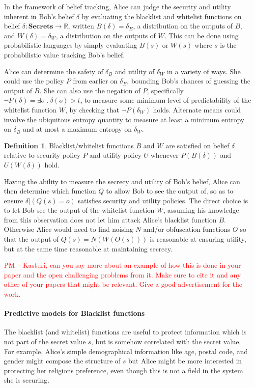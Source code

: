 \documentclass{article} %
\newcommand{\pxm}[1]{\textcolor{red}{PM -- #1}}
\newcommand{\ra}{\rightarrow}
\newcommand{\Real}{\mathbb{R}}
\newcommand{\secrets}[0]{\textbf{Secrets}}
\newcommand{\paren}[1]{\left( #1 \right)}
\newcommand{\cond}[0]{|}
\newcommand{\qsep}[0]{\; . \;}
\theoremstyle{plain} %
\theoremstyle{definition} %
\newtheorem*{definition-un}{Definition}
\begin{document}
In the framework of belief tracking, Alice can judge the security and
utility inherent in Bob's belief $ \delta $ by evaluating the
blacklist and whitelist functions on belief $ \delta : \secrets \ra
\Real $, written $ B(\delta) = \delta_B $, a distribution on the
outputs of $ B $, and $ W(\delta) = \delta_W$, a distribution on the
outputs of $ W $. This can be done using probabilistic languages by
simply evaluating $ B(s) $ or $ W(s) $ where $ s $ is the probabilistic
value tracking Bob's belief.

Alice can determine the safety of $ \delta_B $ and utility of $
\delta_W $ in a variety of ways. She could use the policy $ P $ from
earlier on $ \delta_B $, bounding Bob's chances of guessing the output
of $ B $. She can also use the negation of $ P $, specifically $ \neg
P(\delta) = \exists o \qsep \delta(o) > t $, to measure some minimum
level of predictability of the whitelist function $ W $, by checking
that $ \neg P(\delta_W) $ holds. Alternate means could involve the
ubiquitous entropy quantity to measure at least a minimum entropy on $
\delta_B $ and at most a maximum entropy on $ \delta_W $.

\begin{definition-un} Blacklist/whitelist functions $ B $ and $ W $
  are satisfied on belief $ \delta $ relative to security policy $ P $
  and utility policy $  U $ whenever $P(B(\delta))$ and $U(W(\delta))$ hold.
\end{definition-un}

Having the ability to measure the secrecy and utility of Bob's belief,
Alice can then determine which function $ Q $ to allow Bob to see the
output of, so as to ensure $ \delta \cond \paren{Q(s) = o} $ satisfies
security and utility policies. The direct choice is to let Bob see the
output of the whitelist function $ W $, assuming his knowledge from
this observation does not let him attack Alice's blacklist function $
B $. Otherwise Alice would need to find noising $ N $ and/or
obfuscation functions $ O $ so that the output of $ Q(s) = N(W(O(s)))
$ is reasonable at ensuring utility, but at the same time reasonable
at maintaining secrecy.

\pxm{Kasturi, can you say more about an example of how this is done in
  your paper and the open challenging problems from it. Make sure to
  cite it \cite{chakraborty12balancing} and any other of your papers
  that might be relevant. Give a good advertisement for the work.}

\paragraph*{Predictive models for Blacklist functions} The blacklist
(and whitelist) functions are useful to protect information which is
not part of the secret value $ s $, but is somehow correlated with the
secret value. For example, Alice's simple demographical information
like age, postal code, and gender might compose the structure of $ s $
but Alice might be more interested in protecting her religions
preference, even though this is not a field in the system she is
securing.
\end{document}
